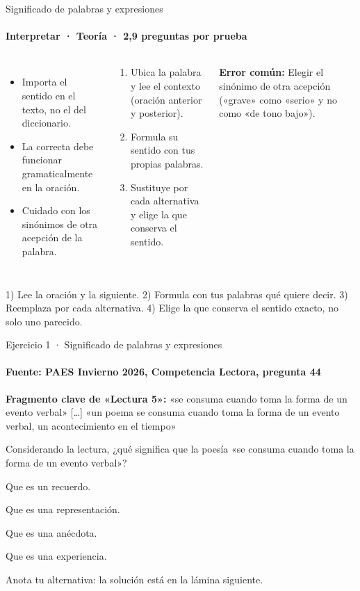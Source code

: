 \documentclass[aspectratio=169,11pt]{beamer}
\newcommand{\alternativa}[2]{\begin{opcion}\tecla{#1}\hspace{0.6em}#2\end{opcion}}
\newlength{\ajustealto}
\newenvironment{ajustar}[1][0.74\textheight]
  {\setlength{\ajustealto}{#1}\begin{lrbox}{\ajustecaja}\begin{minipage}{\textwidth}}
  {\end{minipage}\end{lrbox}%
   \ifdim\dimexpr\ht\ajustecaja+\dp\ajustecaja\relax>\ajustealto
     \resizebox*{!}{\ajustealto}{\usebox{\ajustecaja}}\else\usebox{\ajustecaja}\fi}
\begin{document}
\begin{frame}{Significado de palabras y expresiones}
\label{tema-cl-vocabulario}
\framesubtitle{Interpretar · Teoría · 2,9 preguntas por prueba}
\begin{ajustar}
\begin{columns}[T,onlytextwidth]
\begin{itemize}\footnotesize
\item Importa el sentido en el texto, no el del diccionario.
\item La correcta debe funcionar gramaticalmente en la oración.
\item Cuidado con los sinónimos de otra acepción de la palabra.
\end{itemize}
\begin{cajaregla}\scriptsize \begin{enumerate}\item Ubica la palabra y lee el contexto (oración anterior y posterior).\item Formula su sentido con tus propias palabras.\item Sustituye por cada alternativa y elige la que conserva el sentido.\end{enumerate}\end{cajaregla}
\begin{notagris}\scriptsize \textbf{Error común:} Elegir el sinónimo de otra acepción («grave» como «serio» y no como «de tono bajo»).\end{notagris}
\end{columns}
\begin{cajaclave}\footnotesize
1) Lee la oración y la siguiente. 2) Formula con tus palabras qué quiere decir. 3) Reemplaza por cada alternativa. 4) Elige la que conserva el sentido exacto, no solo uno parecido.
\end{cajaclave}
\end{ajustar}
\end{frame}

\begin{frame}{Ejercicio 1 · Significado de palabras y expresiones}
\framesubtitle{Fuente: PAES Invierno 2026, Competencia Lectora, pregunta 44}
\begin{ajustar}[0.7\textheight]
\begin{notagris}\scriptsize \textbf{Fragmento clave de «Lectura 5»:} «se consuma cuando toma la forma de un evento verbal» [\ldots] «un poema se consuma cuando toma la forma de un evento verbal, un acontecimiento en el tiempo»\end{notagris}
{\small Considerando la lectura, ¿qué significa que la poesía «se consuma cuando toma la forma de un evento verbal»?}
\vspace{0.4em}
\alternativa{A}{Que es un recuerdo.}
\alternativa{B}{Que es una representación.}
\alternativa{C}{Que es una anécdota.}
\alternativa{D}{Que es una experiencia.}
\end{ajustar}
\vfill{\tiny\color{zinc500}\hfill Anota tu alternativa: la solución está en la lámina siguiente.}
\end{frame}
\end{document}
